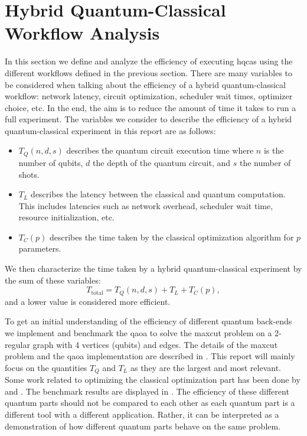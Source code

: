 \section{Hybrid Quantum-Classical Workflow Analysis} \label{sec:hqca-analysis}
In this section we define and analyze the efficiency of executing \glspl{hqca} using the different workflows defined in the previous section.
There are many variables to be considered when talking about the efficiency of a hybrid quantum-classical workflow: network latency, circuit optimization, scheduler wait times, optimizer choice, etc.
In the end, the aim is to reduce the amount of time it takes to run a full experiment.
The variables we consider to describe the efficiency of a hybrid quantum-classical experiment in this report are as follows:
\begin{itemize}
    \item $T_Q(n, d, s)$ describes the quantum circuit execution time where $n$ is the number of qubits, $d$ the depth of the quantum circuit, and $s$ the number of shots.
    \item $T_L$ describes the latency between the classical and quantum computation. This includes latencies such as network overhead, scheduler wait time, resource initialization, etc.
    \item $T_C(p)$ describes the time taken by the classical optimization algorithm for $p$ parameters.
\end{itemize}
We then characterize the time taken by a hybrid quantum-classical experiment by the sum of these variables:
\begin{equation}
T_\text{total} = T_Q(n, d, s) + T_L + T_C(p),
\end{equation}
and a lower value is considered more efficient.

To get an initial understanding of the efficiency of different quantum back-ends we implement and benchmark the \gls{qaoa} to solve the \gls{maxcut} problem on a 2-regular graph with 4 vertices (qubits) and edges.
The details of the \gls{maxcut} problem and the \gls{qaoa} implementation are described in .
This report will mainly focus on the quantities $T_Q$ and $T_L$ as they are the largest and most relevant.
Some work related to optimizing the classical optimization part has been done by \textcite{lavrijsen2020classical} and \textcite{sung2020exploration}.
The benchmark results are displayed in .
The efficiency of these different quantum parts should not be compared to each other as each quantum part is a different tool with a different application.
Rather, it can be interpreted as a demonstration of how different quantum parts behave on the same problem.

